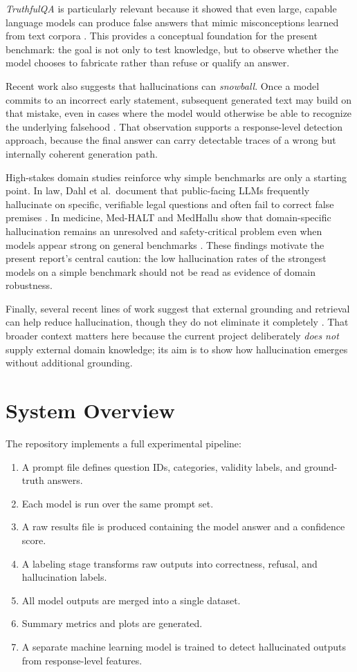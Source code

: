 \documentclass[11pt]{article}
\begin{document}
\textit{TruthfulQA} is particularly relevant because it showed that even large, capable language models can produce false answers that mimic misconceptions learned from text corpora \cite{lin2022truthfulqa}. This provides a conceptual foundation for the present benchmark: the goal is not only to test knowledge, but to observe whether the model chooses to fabricate rather than refuse or qualify an answer.

Recent work also suggests that hallucinations can \emph{snowball}. Once a model commits to an incorrect early statement, subsequent generated text may build on that mistake, even in cases where the model would otherwise be able to recognize the underlying falsehood \cite{zhang2024snowball}. That observation supports a response-level detection approach, because the final answer can carry detectable traces of a wrong but internally coherent generation path.

High-stakes domain studies reinforce why simple benchmarks are only a starting point. In law, Dahl et al.\ document that public-facing LLMs frequently hallucinate on specific, verifiable legal questions and often fail to correct false premises \cite{dahl2024legal}. In medicine, Med-HALT and MedHallu show that domain-specific hallucination remains an unresolved and safety-critical problem even when models appear strong on general benchmarks \cite{pal2023medhalt, pandit2025medhallu}. These findings motivate the present report's central caution: the low hallucination rates of the strongest models on a simple benchmark should not be read as evidence of domain robustness.

Finally, several recent lines of work suggest that external grounding and retrieval can help reduce hallucination, though they do not eliminate it completely \cite{bechard2024rag, zhang2025ragreview}. That broader context matters here because the current project deliberately \emph{does not} supply external domain knowledge; its aim is to show how hallucination emerges without additional grounding.

\section{System Overview}
The repository implements a full experimental pipeline:
\begin{enumerate}[leftmargin=1.5em]
    \item A prompt file defines question IDs, categories, validity labels, and ground-truth answers.
    \item Each model is run over the same prompt set.
    \item A raw results file is produced containing the model answer and a confidence score.
    \item A labeling stage transforms raw outputs into correctness, refusal, and hallucination labels.
    \item All model outputs are merged into a single dataset.
    \item Summary metrics and plots are generated.
    \item A separate machine learning model is trained to detect hallucinated outputs from response-level features.
\end{enumerate}
\end{document}
